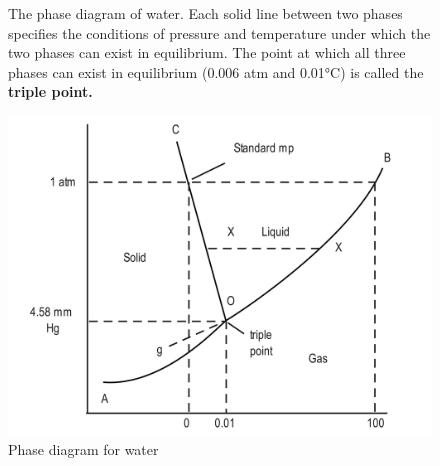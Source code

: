 \documentclass[a4paper,12pt,twocolumn]{article}
\begin{document}
    \begin{figure}[h]
    \caption{The phase diagram of water. Each solid line between two phases specifies the conditions of pressure and temperature under which the two phases can exist in equilibrium. The point at which all three phases can exist in equilibrium (0.006 atm and 0.01°C) is called the \textbf{triple point.}}
\end{figure}

\begin{figure}[h]
\centering
\includegraphics[width=.5\textwidth]{phaseDiagram}
\caption{Phase diagram for water}
\end{figure}
\end{document}

